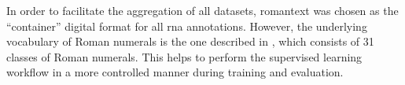 
In order to facilitate the aggregation of all datasets,
\gls{romantext} was chosen as the ``container'' digital
format for all \gls{rna} annotations. However, the
underlying vocabulary of Roman numerals is the one described
in , which consists of
31 classes of Roman numerals. This helps to perform the
supervised learning workflow in a more controlled manner
during training and evaluation.



